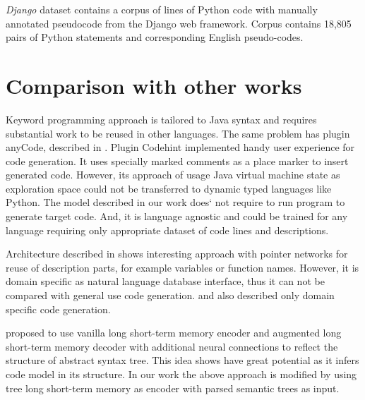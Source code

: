\emph{Django} dataset \parencite{Oda2015} contains a corpus of lines of Python code with manually annotated pseudocode from the Django web framework. Corpus contains 18,805 pairs of Python statements and corresponding English pseudo-codes. 


\section{Comparison with other works}

Keyword programming approach \parencite{little2009keyword} is tailored to Java syntax and requires substantial work to be reused in other languages. The same problem has plugin anyCode, described in \cite{Gvero2015}. Plugin Codehint \parencite{Galenson2014} implemented handy user experience for code generation. It uses specially marked comments as a place marker to insert generated code. However, its approach of usage Java virtual machine state as exploration space could not be transferred to dynamic typed languages like Python. The model described in our work does` not require to run program to generate target code. And, it is language agnostic and could be trained for any language requiring only appropriate dataset of code lines and descriptions.

Architecture described in \cite{Zhong2017} shows interesting approach with pointer networks for reuse of description parts, for example variables or function names. However, it is domain specific as natural language database interface, thus it can not be compared with general use code generation. \cite{Chen2016} and \cite{Ling2016} also described only domain specific code generation.

\cite{Yin2017} proposed to use vanilla long short-term memory encoder and augmented long short-term memory decoder with additional neural connections to reflect the structure of abstract syntax tree. This idea shows have great potential as it infers code model in its structure. In our work the above approach is modified by using tree long short-term memory as encoder with parsed semantic trees as input. 
